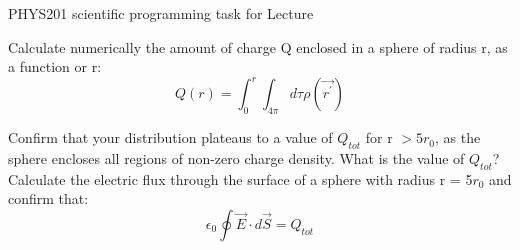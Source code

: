 {\begin{frame}{PHYS201 scientific programming task for Lecture \thislecture}
{\vspace{0.2cm}
Calculate numerically the amount of charge Q enclosed in a sphere of radius r, as a function or r:\\
\begin{equation*}
  Q(r) = \int_{0}^{r} \int_{4\pi} d\tau \rho(\vec{r^\prime})
\end{equation*}

\vspace{0.2cm}
Confirm that your distribution plateaus to a value of $Q_{tot}$ for
r $>5r_0$, as the sphere encloses all regions of non-zero charge density.
What is the value of $Q_{tot}$?\\

\vspace{0.2cm}
Calculate the electric flux through the surface of a sphere with radius r = 5$r_0$
and confirm that:
\begin{equation*}
  \epsilon_0 \oint \vec{E} \cdot d\vec{S} = Q_{tot}
\end{equation*}
}

\end{frame}

} %
